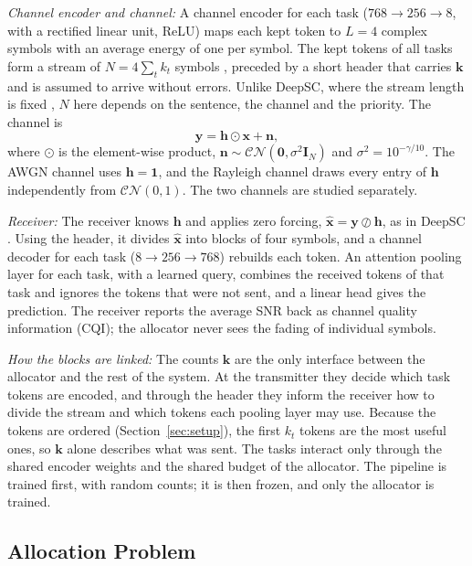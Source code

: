 \documentclass[conference]{IEEEtran}
\begin{document}
\textit{Channel encoder and channel:} A channel encoder for each task
($768 \to 256 \to 8$, with a rectified linear unit, ReLU) maps each kept
token to $L{=}4$ complex symbols with an average energy of one per
symbol. The kept tokens of all tasks form a stream of
$N = 4\sum_t k_t$ symbols \cite{bourtsoulatze2019deep}, preceded by a
short header that carries $\mathbf{k}$ and is assumed to arrive
without errors. Unlike DeepSC, where the stream length is fixed
\cite{xie2021deepsc}, $N$ here depends on the sentence, the channel and
the priority. The channel is
\begin{equation}
  \mathbf{y} = \mathbf{h} \odot \mathbf{x} + \mathbf{n},
  \label{eq:channel}
\end{equation}
where $\odot$ is the element-wise product,
$\mathbf{n} \sim \mathcal{CN}(\mathbf{0}, \sigma^2 \mathbf{I}_N)$ and
$\sigma^2 = 10^{-\gamma/10}$. The AWGN channel uses
$\mathbf{h} = \mathbf{1}$, and the Rayleigh channel draws every entry
of $\mathbf{h}$ independently from $\mathcal{CN}(0,1)$. The two
channels are studied separately.

\textit{Receiver:} The receiver knows $\mathbf{h}$ and applies zero
forcing, $\hat{\mathbf{x}} = \mathbf{y} \oslash \mathbf{h}$, as in
DeepSC \cite{xie2021deepsc}. Using the header, it divides
$\hat{\mathbf{x}}$ into blocks of four symbols, and a channel decoder
for each task ($8 \to 256 \to 768$) rebuilds each token. An attention
pooling layer for each task, with a learned query, combines the
received tokens of that task and ignores the tokens that were not
sent, and a linear head gives the prediction. The receiver reports the
average SNR back as channel quality information (CQI); the allocator
never sees the fading of individual symbols.

\textit{How the blocks are linked:} The counts $\mathbf{k}$ are the only
interface between the allocator and the rest of the system. At the
transmitter they decide which task tokens are encoded, and through the
header they inform the receiver how to divide the stream and which tokens
each pooling layer may use. Because the tokens are ordered
(Section~\ref{sec:setup}), the first $k_t$ tokens are the most useful
ones, so $\mathbf{k}$ alone describes what was sent. The tasks interact
only through the shared encoder weights and the shared budget of the
allocator. The pipeline is trained first, with random counts; it is
then frozen, and only the allocator is trained.

\subsection{Allocation Problem}
\label{ssec:problem}
\end{document}
